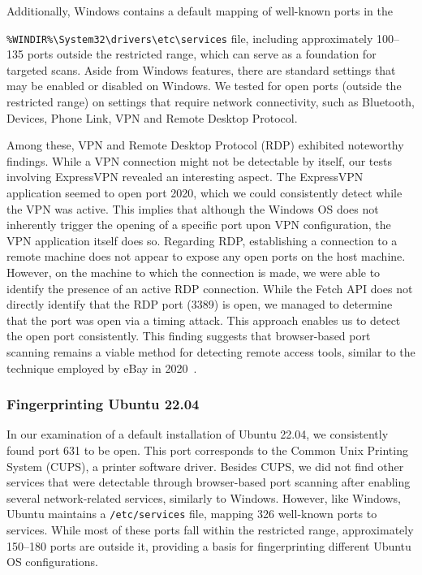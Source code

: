 Additionally, Windows contains a default mapping of well-known ports in the 

\texttt{\%WINDIR\%\textbackslash System32\textbackslash drivers\textbackslash etc\textbackslash services} file, including approximately 100–135 ports outside the restricted range, which can serve as a foundation for targeted scans.
Aside from Windows features, there are standard settings that may be enabled or disabled on Windows. We tested for open ports (outside the restricted range) on settings that require network connectivity, such as Bluetooth, Devices, Phone Link, VPN and Remote Desktop Protocol.

Among these, VPN and Remote Desktop Protocol (RDP) exhibited noteworthy findings. While a VPN connection might not be detectable by itself, our tests involving ExpressVPN revealed an interesting aspect. The ExpressVPN application seemed to open port 2020, which we could consistently detect while the VPN was active. This implies that although the Windows OS does not inherently trigger the opening of a specific port upon VPN configuration, the VPN application itself does so.
Regarding RDP, establishing a connection to a remote machine does not appear to expose any open ports on the host machine. However, on the machine to which the connection is made, we were able to identify the presence of an active RDP connection. While the Fetch API does not directly identify that the RDP port (3389) is open, we managed to determine that the port was open via a timing attack. This approach enables us to detect the open port consistently. This finding suggests that browser-based port scanning remains a viable method for detecting remote access tools, similar to the technique employed by eBay in 2020~\cite{ebay_port_scans}.

\subsubsection{Fingerprinting Ubuntu 22.04}

In our examination of a default installation of Ubuntu 22.04, we consistently found port 631 to be open. This port corresponds to the Common Unix Printing System (CUPS), a printer software driver.
Besides CUPS, we did not find other services that were detectable through browser-based port scanning after enabling several network-related services, similarly to Windows.
However, like Windows, Ubuntu maintains a \texttt{/etc/services} file, mapping 326 well-known ports to services. While most of these ports fall within the restricted range, approximately 150–180 ports are outside it, providing a basis for fingerprinting different Ubuntu OS configurations.

